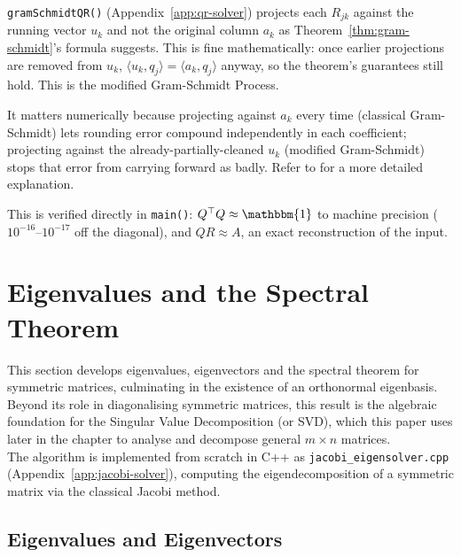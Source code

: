 	\begin{compremark}
		\texttt{gramSchmidtQR()} (Appendix~\ref{app:qr-solver}) projects each $R_{jk}$ against the running vector $u_k$ and not the original column $a_k$ as Theorem~\ref{thm:gram-schmidt}'s formula suggests. This is fine mathematically: once earlier projections are removed from $u_k$, $\langle u_k,q_j\rangle = \langle a_k,q_j\rangle$ anyway, so the theorem's guarantees still hold. This is the modified Gram-Schmidt Process.
		
		It matters numerically because projecting against $a_k$ every time (classical Gram-Schmidt) lets rounding error compound independently in each coefficient; projecting against the already-partially-cleaned $u_k$ (modified Gram-Schmidt) stops that error from carrying forward as badly. Refer to \cite[\S 5.2.7--5.2.9]{GolubVanLoan2013} for a more detailed explanation.
		
		This is verified directly in \texttt{main()}: $Q^\top Q \approx \mathbbm{1}$ to machine precision ($10^{-16}$--$10^{-17}$ off the diagonal), and $QR \approx A$, an exact reconstruction of the input.
	\end{compremark}
	
\section{Eigenvalues and the Spectral Theorem}
\label{sec:eigenvalues-spectral-theorem}
	
	This section develops eigenvalues, eigenvectors and the spectral theorem for symmetric matrices, culminating in the existence of an orthonormal eigenbasis. \\
	
	Beyond its role in diagonalising symmetric matrices, this result is the algebraic foundation for the Singular Value Decomposition (or SVD), which this paper uses later in the chapter to analyse and decompose general $m\times n$ matrices. \\
	
	The algorithm is implemented from scratch in C++ as \texttt{jacobi\_eigensolver.cpp} (Appendix~\ref{app:jacobi-solver}), computing the eigendecomposition of a symmetric matrix via the classical Jacobi method.
	
	\subsection{Eigenvalues and Eigenvectors}
	\label{sec:eigenvalues-and-eigenvectors}
		
